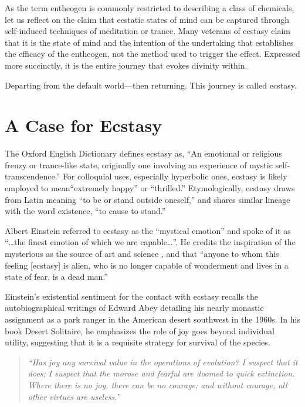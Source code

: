 \documentclass{UIdahoMastersThesis}
\begin{document}
As the term entheogen is commonly restricted to describing a class of chemicals, let us reflect on the claim that ecstatic states of mind can be captured through self-induced techniques of meditation or trance. Many veterans of ecstasy claim that it is the state of mind and the intention of the undertaking that establishes the efficacy of the entheogen, not the method used to trigger the effect. Expressed more succinctly, it is the entire journey that evokes divinity within. 

Departing from the default world---then returning. This journey is called ecstasy.


\section{A Case for Ecstasy}
The Oxford English Dictionary defines ecstasy as, ``An emotional or religious frenzy or trance-like state, originally one involving an experience of mystic self-transcendence.'' For colloquial uses, especially hyperbolic ones, ecstasy is likely employed to mean``extremely happy'' or ``thrilled.'' Etymologically, ecstasy draws from Latin meaning ``to be or stand outside oneself,'' and shares similar lineage with the word existence, ``to cause to stand.''
 
Albert Einstein referred to ecstasy as the ``mystical emotion'' and spoke of it as ``\ldots the finest emotion of which we are capable\ldots''. He credits the inspiration of the mysterious as the source of art and science , and that ``anyone to whom this feeling [ecstasy] is alien, who is no longer capable of wonderment and lives in a state of fear, is a dead man.'' \cite{einstein_science_1930}

Einstein's existential sentiment for the contact with ecstasy recalls the autobiographical writings of Edward Abey detailing his nearly monastic assignment as a park ranger in the American desert southwest in the 1960s. In his book Desert Solitaire, he emphasizes the role of joy goes beyond individual utility, suggesting that it is a requisite strategy for survival of the species. 


\begin{quote}
\textit{``Has joy any survival value in the operations of evolution? I suspect that it does; I suspect that the morose and fearful are doomed to quick extinction. Where there is no joy, there can be no courage; and without courage, all other virtues are useless.''}
\end{quote}
\end{document}
